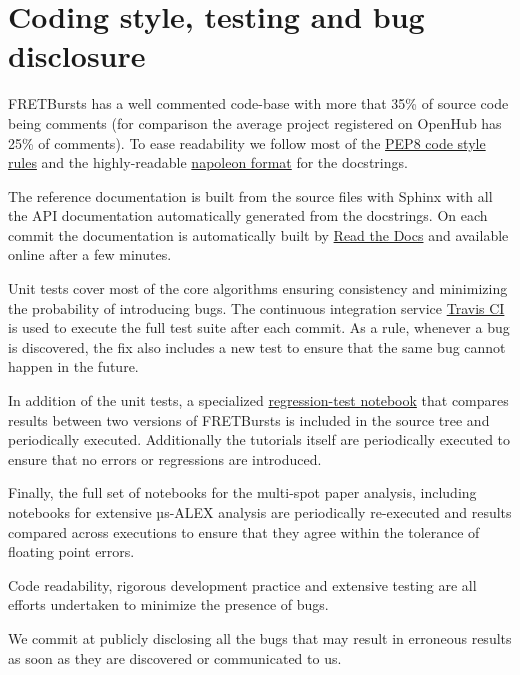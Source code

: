 \section{Coding style, testing and bug disclosure}

FRETBursts has a well commented code-base with more that 35\% of source code
being comments (for comparison the average project registered on OpenHub has 25\%
of comments). To ease readability we follow most of the 
\href{https://www.python.org/dev/peps/pep-0008/}{PEP8 code style rules} and 
the highly-readable \href{http://sphinxcontrib-napoleon.readthedocs.org/}{napoleon format}
for the docstrings.

The reference documentation is built from the source files with Sphinx with
all the API documentation automatically generated from the docstrings.
On each commit the documentation is automatically built by 
\href{https://readthedocs.org/}{Read the Docs}
and available online after a few minutes.

Unit tests cover most of the core algorithms ensuring consistency and 
minimizing the probability of introducing bugs. The continuous integration
service \href{http://travis-ci.org}{Travis CI} is used to execute the full
test suite after each commit.
As a rule, whenever a bug is discovered, the  fix also includes a new test 
to ensure that the same bug cannot happen in the future.

In addition of the unit tests, a specialized 
\href{https://github.com/tritemio/FRETBursts/blob/master/notebooks/dev/tests/FRETBursts\%20-\%20Regression\%20tests.ipynb}{regression-test notebook}
that compares results between two versions of FRETBursts is
included in the source tree and periodically executed. Additionally
the tutorials itself are periodically executed to ensure that
no errors or regressions are introduced.

Finally, the full set of notebooks for the multi-spot paper analysis,
including notebooks for extensive µs-ALEX analysis are periodically
re-executed and results compared across executions to ensure that 
they agree within the tolerance of floating point errors.

Code readability, rigorous development practice and extensive testing
are all efforts undertaken to minimize the presence of bugs.

We commit at publicly disclosing all the bugs that may result in erroneous results 
as soon as they are discovered or communicated to us.
